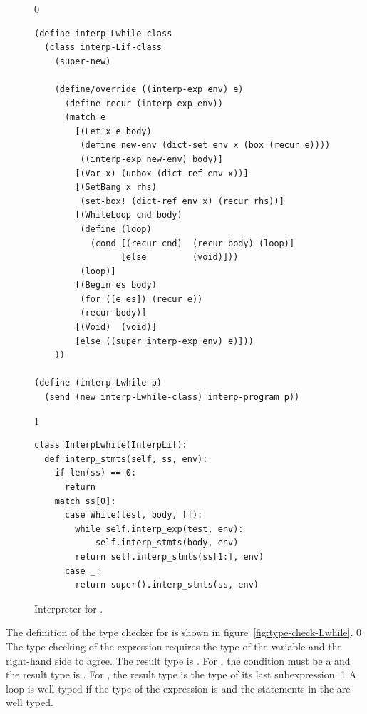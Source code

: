 \documentclass[7x10]{TimesAPriori_MIT}%
\def\racketEd{0}
\def\pythonEd{1}
\def\edition{0}
\numberwithin{theorem}{chapter}
\numberwithin{definition}{chapter}
\numberwithin{equation}{chapter}
\begin{document}
\begin{figure}[tbp]
\begin{tcolorbox}[colback=white]  
{\if\edition\racketEd    
\begin{lstlisting}[basicstyle=\ttfamily\footnotesize]
(define interp-Lwhile-class
  (class interp-Lif-class
    (super-new)

    (define/override ((interp-exp env) e)
      (define recur (interp-exp env))
      (match e
        [(Let x e body)
         (define new-env (dict-set env x (box (recur e))))
         ((interp-exp new-env) body)]
        [(Var x) (unbox (dict-ref env x))]
        [(SetBang x rhs)
         (set-box! (dict-ref env x) (recur rhs))]
        [(WhileLoop cnd body)
         (define (loop)
           (cond [(recur cnd)  (recur body) (loop)]
                 [else         (void)]))
         (loop)]
        [(Begin es body)
         (for ([e es]) (recur e))
         (recur body)]
        [(Void)  (void)]
        [else ((super interp-exp env) e)]))
    ))

(define (interp-Lwhile p)
  (send (new interp-Lwhile-class) interp-program p))
\end{lstlisting}
\fi}
{\if\edition\pythonEd
\begin{lstlisting}
class InterpLwhile(InterpLif):
  def interp_stmts(self, ss, env):
    if len(ss) == 0:
      return
    match ss[0]:
      case While(test, body, []):
        while self.interp_exp(test, env):
            self.interp_stmts(body, env)
        return self.interp_stmts(ss[1:], env)
      case _:
        return super().interp_stmts(ss, env)
\end{lstlisting}
\fi}
\end{tcolorbox}

\caption{Interpreter for \LangLoop{}.}
\label{fig:interp-Lwhile}
\end{figure}

The definition of the type checker for \LangLoop{} is shown in
figure~\ref{fig:type-check-Lwhile}.
%
{\if\edition\racketEd    
%
The type checking of the  expression requires the type
of the variable and the right-hand side to agree. The result type is
. For , the condition must be a \BOOLTY{}
and the result type is .  For , the result type
is the type of its last subexpression.
%
\fi}
%
{\if\edition\pythonEd
%
A  loop is well typed if the type of the 
expression is  and the statements in the  are
well typed.
%
\fi}
\end{document}

